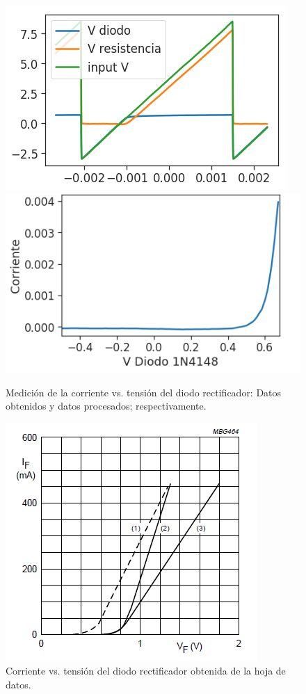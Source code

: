 \begin{figure}[!ht]
\centering
\includegraphics[scale=0.5]{../EJ1/DiodoRectificador/datosOsciloscopio}
\includegraphics[scale=0.5]{../EJ1/DiodoRectificador/diodoRectMedido}
\caption{Medici\'on de la corriente vs. tensi\'on del diodo rectificador: Datos obtenidos y datos procesados; respectivamente.}
\label{med1b}
\end{figure}

\begin{figure}[!ht]
\centering
\includegraphics[scale=0.52]{../EJ1/DiodoRectificador/corrienteDiodoDatasheet}
\caption{Corriente vs. tensi\'on del diodo rectificador obtenida de la hoja de datos.}
\label{med1c}
\end{figure}

